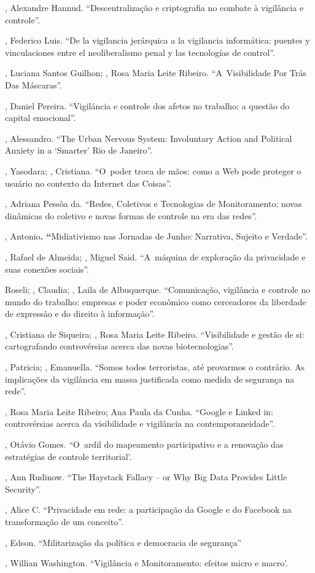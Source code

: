 \begin{Parskip}
, Alexandre Hannud. ``Descentralização e criptografia no combate à
vigilância e controle''.

, Federico Luis. ``De la vigilancia jerárquica a la vigilancia
informática: puentes y vinculaciones entre el neoliberalismo penal y las
tecnologías de control''.

, Luciana Santos Guilhon; , Rosa Maria Leite Ribeiro.
``A~Visibilidade Por Trás Das Máscaras''.

, Daniel Pereira. ``Vigilância e controle dos afetos no trabalho:
a questão do capital emocional''. ~

, Alessandro. ``The Urban Nervous System: Involuntary Action and
Political Anxiety in a `Smarter' Rio de Janeiro''.

, Yasodara; , Cristiana. ``O~poder troca de mãos: como a
Web pode proteger o usuário no contexto da Internet das Coisas''.

, Adriana Pessôa da. ``Redes, Coletivos e Tecnologias de
Monitoramento: novas dinâmicas do coletivo e novas formas de controle na
era das redes''.

, Antonio\textbf{. ``}Midiativismo nas Jornadas de Junho:
Narrativa, Sujeito e Verdade''.

, Rafael de Almeida; , Miguel Said. ``A~máquina de
exploração da privacidade e suas conexões sociais''.

 Roseli; , Claudia; , Laila de Albuquerque.
``Comunicação, vigilância e controle no mundo do trabalho: empresas e
poder econômico como cerceadores da liberdade de expressão e do direito
à informação''.

, Cristiana de Siqueira; , Rosa Maria Leite Ribeiro.
``Visibilidade e gestão de si: cartografando controvérsias acerca das
novas biotecnologias''.

, Patricia; , Emanuella. ``Somos todos terroristas, até
provarmos o contrário. As implicações da vigilância em massa justificada
como medida de segurança na rede''.

, Rosa Maria Leite Ribeiro;  Ana Paula da Cunha. ``Google
e Linked in: controvérsias acerca da visibilidade e vigilância na
contemporaneidade''.

, Otávio Gomes. ``O~ardil do mapeamento participativo e a renovação
das estratégias de controle territorial'.

, Ann Rudinow. ``The Haystack Fallacy -- or Why Big Data Provides
Little Security''.

, Alice C. ``Privacidade em rede: a participação da Google e do
Facebook na transformação de um conceito''.

, Edson. ``Militarização da política e democracia de segurança''

, Willian Washington. ``Vigilância e Monitoramento: efeitos micro e
macro'.
\end{Parskip}